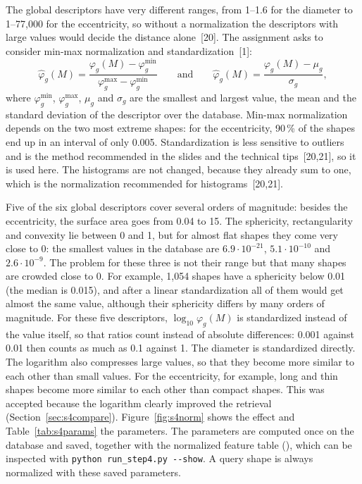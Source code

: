 \documentclass[10pt,a4paper]{article}
\begin{document}
The global descriptors have very different ranges, from 1--1.6 for the diameter to 1--77,000 for the eccentricity, so without a
normalization the descriptors with large values would decide the distance alone~[20]. The assignment asks to consider min-max
normalization and standardization~[1]:
\begin{equation}
\hat\varphi_g(M)=\frac{\varphi_g(M)-\varphi_g^{\min}}{\varphi_g^{\max}-\varphi_g^{\min}}
\qquad\text{and}\qquad
\hat\varphi_g(M)=\frac{\varphi_g(M)-\mu_g}{\sigma_g},
\label{eq:s4norm}
\end{equation}
where $\varphi_g^{\min}$, $\varphi_g^{\max}$, $\mu_g$ and $\sigma_g$ are the smallest and largest value, the mean and the
standard deviation of the descriptor over the database. Min-max normalization depends on the two most extreme shapes: for the
eccentricity, 90\,\% of the shapes end up in an interval of only 0.005. Standardization is less sensitive to outliers and is the
method recommended in the slides and the technical tips~[20,21], so it is used here. The histograms are not changed, because they
already sum to one, which is the normalization recommended for histograms~[20,21].

Five of the six global descriptors cover several orders of magnitude: besides the eccentricity, the surface area goes from 0.04
to 15. The sphericity, rectangularity and convexity lie between 0 and 1, but for almost flat shapes they come very close
to 0: the smallest values in the database are $6.9\cdot10^{-21}$, $5.1\cdot10^{-10}$ and $2.6\cdot10^{-9}$. The problem for these
three is not their range but that many shapes are crowded close to 0. For example, 1,054 shapes have a sphericity below 0.01
(the median is 0.015), and after a linear standardization all of them would get almost the same value, although their sphericity
differs by many orders of magnitude. For these five descriptors, $\log_{10}\varphi_g(M)$ is standardized instead of the value
itself, so that ratios count instead of absolute differences: 0.001 against 0.01 then counts as much as 0.1 against 1. The
diameter is standardized directly. The logarithm also compresses large values, so that they become more similar to each other
than small values. For the eccentricity, for example, long and thin shapes become more similar to each other than compact
shapes. This was accepted because the logarithm clearly improved the retrieval (Section~\ref{sec:s4compare}). Figure~\ref{fig:s4norm} shows the effect and Table~\ref{tab:s4params} the parameters. The
parameters are computed once on the database and saved, together with the normalized feature table
(), which can be inspected with \texttt{python run\_step4.py -{}-show}. A query
shape is always normalized with these saved parameters.
\end{document}
